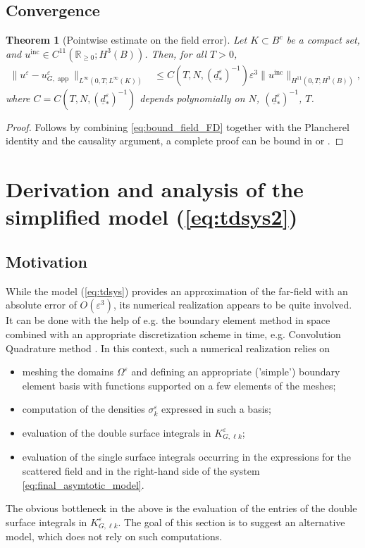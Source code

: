 \documentclass[]{article}
\newtheorem{theorem}{Theorem}
\numberwithin{equation}{section}
\numberwithin{theorem}{section}
\numberwithin{lemma}{section}
\numberwithin{corollary}{section}
\numberwithin{proposition}{section}
\numberwithin{definition}{section}
\newcommand{\re}{\varepsilon}
\begin{document}
	\subsection{Convergence}
	\begin{theorem}[Pointwise estimate on the field error]
		\label{theorem:point_wise_estimate}
		Let $K\subset B^c $ be a compact set, and $ u^{\operatorname{inc}} \in C^{11}(\mathbb{R}_{\geq 0}; H^3(B)) $. Then, for all $T>0$, 
		\begin{align*}%
			\|u^{\re}- u^{\re}_{G, \operatorname{\operatorname{app}}}\|_{L^{\infty}(0,T; L^{\infty}(K))} &\leq C(T, N, (\underline{d}^{\re}_{*})^{-1}) \re^3 \| u^{\operatorname{inc}} \|_{H^{11}(0, T;H^3(B))},
		\end{align*}
		where $C=C(T, N, (\underline{d}^{\re}_{*})^{-1})$ depends  polynomially on $N$, $(\underline{d}^{\re}_{*})^{-1}$, $T$.
	\end{theorem}
	\begin{proof}
		Follows by combining \eqref{eq:bound_field_FD} together with the Plancherel identity and the causality argument, a complete proof can be bound in \cite[Section 4.5.2]{MK} or \cite[Proof of Proposition 3.2.2]{sayas}.
	\end{proof}
	
	\section{Derivation and analysis of the simplified model (\ref{eq:tdsys2})}
	\label{sec:simplified_models}
	\subsection{Motivation}
	While the model (\ref{eq:tdsys}) provides an approximation of the far-field with an absolute error of $O(\re^3)$, its numerical realization appears to be quite involved. It can be done with the help of e.g. the boundary element method in space combined with an appropriate discretization scheme in time, e.g. Convolution Quadrature method \cite{lubich88_1, lubich88_2, lubich94}. In this context, such a numerical realization relies on 
	\begin{itemize}[leftmargin=*]
		\item meshing the domains $\Omega^{\varepsilon}$ and defining an appropriate ('simple') boundary element basis with functions supported on a few elements of the meshes;
		\item computation of the densities $\sigma_k^{\varepsilon}$ expressed in such a basis;
		\item evaluation of the double surface integrals in $K^{\varepsilon}_{G, \ell k}$;
		\item evaluation of the single surface integrals occurring in the expressions for the scattered field and in the right-hand side of the system \eqref{eq:final_asymtotic_model}.
	\end{itemize}
	The obvious bottleneck in the above is the evaluation of the entries of the double surface integrals in $K^{\varepsilon}_{G, \ell k}$. The goal of this section is to suggest an alternative model, which does not rely on such computations. 
\end{document}
